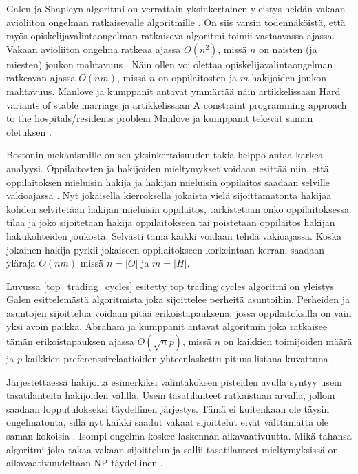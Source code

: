 \documentclass[twoside]{tktltiki}
\begin{document}
Galen ja Shapleyn algoritmi on verrattain yksinkertainen yleistys
heidän vakaan avioliiton ongelman ratkaisevalle algoritmille
\cite{gusfield89}. On siis varsin todennäköistä, että myös
opiskelijavalintaongelman ratkaiseva algoritmi toimii vastaavassa
ajassa. Vakaan avioliiton ongelma ratkeaa ajassa $O(n^2)$, missä $n$
on naisten (ja miesten) joukon mahtavuus \cite{gusfield89}. Näin ollen
voi olettaa opiskelijavalintaongelman ratkeavan ajassa $O(nm)$, missä
$n$ on oppilaitosten ja $m$ hakijoiden joukon mahtavuus. Manlove ja
kumppanit antavat ymmärtää näin artikkelissaan Hard variants of stable
marriage \cite{manlove02} ja artikkelissaan A constraint programming
approach to the hospitals/residents problem Manlove ja kumppanit
tekevät saman oletuksen \cite{manlove07}.

Bostonin mekanismille on sen yksinkertaisuuden takia helppo antaa
karkea analyysi. Oppilaitosten ja hakijoiden mieltymykset voidaan
esittää niin, että oppilaitoksen mieluisin hakija ja hakijan mieluisin
oppilaitos saadaan selville vakioajassa \cite{gusfield89}. Nyt
jokaisella kierroksella jokaista vielä sijoittamatonta hakijaa kohden
selvitetään hakijan mieluisin oppilaitos, tarkistetaan onko
oppilaitoksessa tilaa ja joko sijoitetaan hakija oppilaitokseen tai
poistetaan oppilaitos hakijan hakukohteiden joukosta. Selvästi tämä
kaikki voidaan tehdä vakioajassa. Koska jokainen hakija pyrkii
jokaiseen oppilaitokseen korkeintaan kerran, saadaan yläraja $O(nm)$
missä $n = |O|$ ja $m = |H|$.

\enlargethispage{\baselineskip} Luvussa \ref{top_trading_cycles}
esitetty top trading cycles algoritmi on yleistys Galen esittelemästä
algoritmista joka sijoittelee perheitä asuntoihin. Perheiden ja
asuntojen sijoittelua voidaan pitää erikoistapauksena, jossa
oppilaitoksilla on vain yksi avoin paikka. Abraham ja kumppanit
antavat algoritmin joka ratkaisee tämän erikoistapauksen ajassa
$O(\sqrt np)$, missä $n$ on kaikkien toimijoiden määrä ja $p$ kaikkien
preferenssirelaatioiden yhteenlaskettu pituus listana kuvattuna
\cite{abraham05}.

Järjestettäessä hakijoita esimerkiksi valintakokeen pisteiden avulla
syntyy usein tasatilanteita hakijoiden välillä. Usein tasatilanteet
ratkaistaan arvalla, jolloin saadaan lopputulokseksi täydellinen
järjestys. Tämä ei kuitenkaan ole täysin ongelmatonta, sillä nyt
kaikki saadut vakaat sijoittelut eivät välttämättä ole saman kokoisia
\cite{manlove02}. Isompi ongelma koskee laskennan aikavaativuutta.
Mikä tahansa algoritmi joka takaa vakaan sijoittelun ja sallii
tasatilanteet mieltymyksissä on aikavaativuudeltaan NP-täydellinen
\cite{manlove02}.
\end{document}
